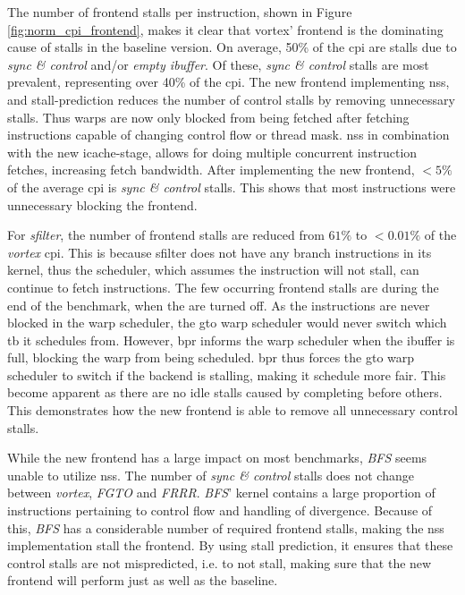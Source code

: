 The number of frontend stalls per instruction, shown in Figure \ref{fig:norm_cpi_frontend}, makes it clear that \Gls{vortex}' frontend is the dominating cause of stalls in the baseline version. On average, 50\% of the \acrshort{cpi} are stalls due to \textit{sync \& control} and/or \textit{empty ibuffer}. Of these, \textit{sync \& control} stalls are most prevalent, representing over 40\% of the \acrshort{cpi}. The new frontend implementing \acrshort{nss}, and stall-prediction reduces the number of control stalls by removing unnecessary stalls. Thus warps are now only blocked from being fetched after fetching instructions capable of changing control flow or thread mask. \acrshort{nss} in combination with the new icache-stage, allows for doing multiple concurrent instruction fetches, increasing fetch bandwidth. After implementing the new frontend, $<5\%$ of the average \acrshort{cpi} is \textit{sync \& control} stalls. This shows that most instructions were unnecessary blocking the frontend. 

For \textit{sfilter}, the number of frontend stalls are reduced from $61\%$ to $<0.01\%$ of the \textit{\Gls{vortex}} \acrshort{cpi}. This is because sfilter does not have any branch instructions in its kernel, thus the scheduler, which assumes the instruction will not stall, can continue to fetch instructions. The few occurring frontend stalls are during the end of the benchmark, when the  are turned off. As the instructions are never blocked in the warp scheduler, the \acrshort{gto} warp scheduler would never switch which \acrshort{tb} it schedules from. However, \acrshort{bpr} informs the warp scheduler when the ibuffer is full, blocking the warp from being scheduled. \acrshort{bpr} thus forces the \acrshort{gto} warp scheduler to switch if the backend is stalling, making it schedule more fair. This become apparent as there are no idle stalls caused by  completing before others. This demonstrates how the new frontend is able to remove all unnecessary control stalls.

While the new frontend has a large impact on most benchmarks, \textit{BFS} seems unable to utilize \acrshort{nss}. The number of \textit{sync \& control} stalls does not change between \textit{\Gls{vortex}}, \textit{FGTO} and \textit{FRRR}. \textit{BFS}' kernel contains a large proportion of instructions pertaining to control flow and handling of divergence. Because of this, \textit{BFS} has a considerable number of required frontend stalls, making the \acrshort{nss} implementation stall the frontend. By using stall prediction, it ensures that these control stalls are not mispredicted, i.e. to not stall, making sure that the new frontend will perform just as well as the baseline. 

